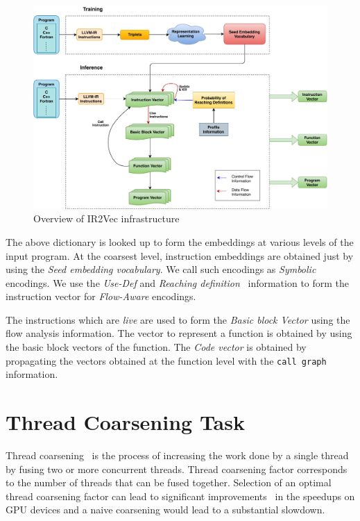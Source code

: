 \begin{figure}[t]
    \centering
    \includegraphics[scale=0.5]{figures/chapter-2/flow.pdf}
    \caption{Overview of IR2Vec infrastructure}
     \label{fig:IR2Vec-Overview}
\end{figure}

The above dictionary is looked up to form the embeddings at various levels of the input program. 
At the coarsest level, instruction embeddings are obtained just by using the \textit{Seed embedding vocabulary}. We call such encodings as \textit{Symbolic} encodings.
We use the \textit{Use-Def} and \textit{Reaching definition}~\cite{Hecht:1977:FAC:540175, muchnick1997advanced} information to form the instruction vector for \textit{Flow-Aware} encodings. 

The instructions which are \textit{live} are used to form the \textit{Basic block Vector}  using the flow analysis information. The vector to represent a function is obtained by using the basic block vectors of the function. The \textit{Code vector} is obtained by propagating the vectors obtained at the function level with the \texttt{call graph} information.

\section{Thread Coarsening Task}\label{sec:tc:task}
Thread coarsening~\cite{Volkov-Demmel-10.5555/1413370.1413402} is the process of increasing the work done by a single thread by fusing two or more concurrent threads. Thread coarsening factor corresponds to the number of threads that can be fused together. Selection of an optimal thread coarsening factor can lead to significant improvements~\cite{Magni-SC13-DBLP:conf/sc/MagniDO13} in the speedups on GPU devices and a naive coarsening would lead to a substantial slowdown.

